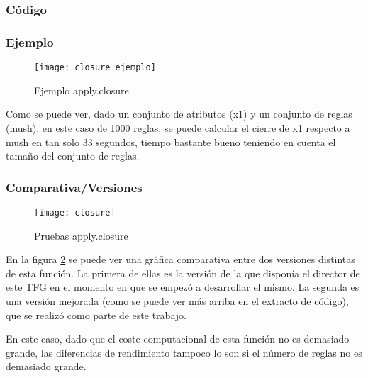 \subsubsection{C\'odigo} 

\subsubsection{Ejemplo} 
\begin{figure}[h]
    \centering
    \texttt{[image: closure\_ejemplo]}
    \caption{Ejemplo apply.closure}
    \label{fig:closure_ejemplo}
\end{figure} 

Como se puede ver, dado un conjunto de atributos (x1) y un conjunto de reglas (mush), en este caso de 1000 reglas, se puede calcular el cierre de x1 respecto a mush en tan solo 33 segundos, tiempo bastante bueno teniendo en cuenta el tama\~no del conjunto de reglas.
\subsubsection{Comparativa/Versiones} 

\begin{figure}[H]
    \centering
    \texttt{[image: closure]}
    \caption{Pruebas apply.closure}
    \label{fig:closure}
\end{figure} 

En la figura \ref{fig:closure} se puede ver una gr\'afica comparativa entre dos versiones distintas de esta funci\'on. La primera de ellas es la versi\'on de la que dispon\'ia el director de este TFG en el momento en que se empez\'o a desarrollar el mismo. La segunda es una versi\'on mejorada (como se puede ver m\'as arriba en el extracto de c\'odigo), que se realiz\'o como parte de este trabajo.

En este caso, dado que el coste computacional de esta funci\'on no es demasiado grande, las diferencias de rendimiento tampoco lo son si el n\'umero de reglas no es demasiado grande.

